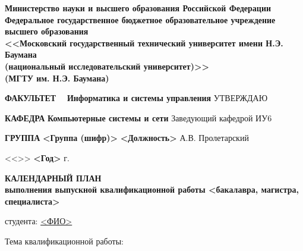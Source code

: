 \documentclass[utf8x, 14pt, oneside, a4paper]{article}
\begin{document}
	\thispagestyle{empty}

	\begin{center}
		\fontsize{12pt}{0.3\baselineskip}\selectfont 
		\textbf{Министерство науки и высшего образования Российской Федерации
		\\ Федеральное государственное бюджетное образовательное учреждение
		\\ высшего образования
		\\ <<Московский государственный технический университет имени Н.Э. Баумана
		\\ (национальный исследовательский университет)>>
		\\ (МГТУ им. Н.Э. Баумана)}

		\fontsize{12pt}{0.5\baselineskip}\selectfont
		\noindent \makebox[\linewidth]{\rule{\textwidth}{4pt}} \makebox[\linewidth]{\rule{\textwidth}{1pt}}
	\end{center}

	\begin{flushleft}
		\fontsize{12pt}{\baselineskip}\selectfont \textbf{ФАКУЛЬТЕТ} \ \ \textbf{Информатика и системы управления} \hfill УТВЕРЖДАЮ

		\textbf{КАФЕДРА} \hspace{4.6mm} \textbf{Компьютерные системы и сети} \hfill Заведующий кафедрой ИУ6

		\textbf{ГРУППА} \hspace{7mm} \textbf{<Группа (шифр)>} \hfill \textbf{<Должность>} \uline{\hspace*{2cm}} А.В. Пролетарский

		\hfill <<\uline{\hspace*{1cm}}>> \uline{\hspace*{2.5cm}} \textbf{<Год>} г.
	\end{flushleft}

	\begin{center}
		\normalsize

		\textbf{КАЛЕНДАРНЫЙ ПЛАН \\ выполнения выпускной квалификационной работы <бакалавра, магистра, специалиста>}

		студента: \uline{\hfill<ФИО>\hfill}
	\end{center}

	\begin{flushleft}
		\fontsize{12pt}{\baselineskip}\selectfont Тема квалификационной работы: \uline{\hfill} \\ \uline{\hfill}
	\end{flushleft}
\end{document}
